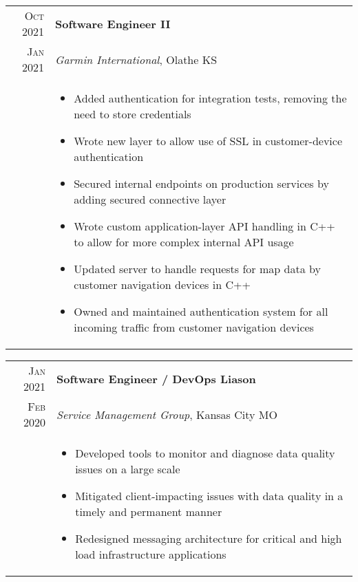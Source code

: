 \documentclass[a4paper,10pt]{article}
\begin{document}
\begin{tabular}{r|p{15cm}}
  \textsc{Oct 2021}  & \textbf{Software Engineer II} \\
  \textsc{Jan 2021}  & \textit{Garmin International}, Olathe KS
  \\ &
       \begin{itemize}
       \item Added authentication for integration tests, removing the need to store credentials
       \item Wrote new layer to allow use of SSL in customer-device authentication
       \item Secured internal endpoints on production services by adding secured connective layer
       \item Wrote custom application-layer API handling in C++ to allow for more complex internal API usage
       \item Updated server to handle requests for map data by customer navigation devices in C++
       \item Owned and maintained authentication system for all incoming traffic from customer navigation devices
       \end{itemize} \\
\end{tabular}

\begin{tabular}{r|p{15cm}}
  \textsc{Jan 2021}  & \textbf{Software Engineer / DevOps Liason} \\
  \textsc{Feb 2020}  & \textit{Service Management Group}, Kansas City MO
  \\ &
       \begin{itemize}
       \item Developed tools to monitor and diagnose data quality issues on a large scale
       \item Mitigated client-impacting issues with data quality in a timely and permanent manner
       \item Redesigned messaging architecture for critical and high load infrastructure applications
       \end{itemize} \\
\end{tabular}
\end{document}
